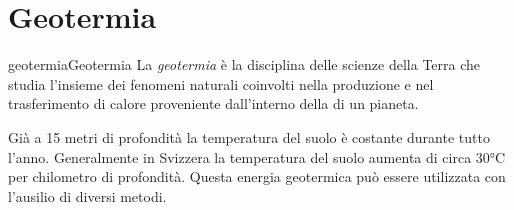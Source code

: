\documentclass[preview]{standalone}
\begin{document}
\genpage

\section{Geotermia}

\begin{snippetdefinition}{geotermia}{Geotermia}
    La \textit{geotermia} è la disciplina delle scienze della
    Terra che studia l'insieme dei fenomeni naturali coinvolti nella
    produzione e nel trasferimento di calore proveniente dall'interno della di un pianeta.
\end{snippetdefinition}

\begin{plainhtml}
    Già a 15 metri di profondità la temperatura del suolo
    è costante durante tutto l'anno.
    Generalmente in Svizzera la temperatura del suolo aumenta di circa 30°C
    per chilometro di profondità.
    Questa energia geotermica può essere utilizzata con l'ausilio di diversi metodi.
\end{plainhtml}
\end{document}
